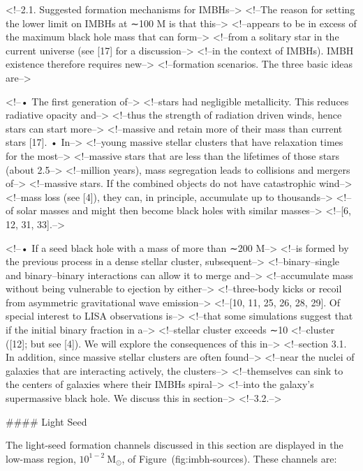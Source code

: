 {{{{{{{{{{{<!--2.1. Suggested formation mechanisms for IMBHs-->
<!--The reason for setting the lower limit on IMBHs at ∼100 M is that this-->
<!--appears to be in excess of the maximum black hole mass that can form-->
<!--from a solitary star in the current universe (see [17] for a discussion-->
<!--in the context of IMBHs). IMBH existence therefore requires new-->
<!--formation scenarios. The three basic ideas are-->

<!--• The first generation of-->
<!--stars had negligible metallicity. This reduces radiative opacity and-->
<!--thus the strength of radiation driven winds, hence stars can start more-->
<!--massive and retain more of their mass than current stars [17]. • In-->
<!--young massive stellar clusters that have relaxation times for the most-->
<!--massive stars that are less than the lifetimes of those stars (about 2.5-->
<!--million years), mass segregation leads to collisions and mergers of-->
<!--massive stars. If the combined objects do not have catastrophic wind-->
<!--mass loss (see [4]), they can, in principle, accumulate up to thousands-->
<!--of solar masses and might then become black holes with similar masses-->
<!--[6, 12, 31, 33].-->

<!--• If a seed black hole with a mass of more than ∼200 M-->
<!--is formed by the previous process in a dense stellar cluster, subsequent-->
<!--binary–single and binary–binary interactions can allow it to merge and-->
<!--accumulate mass without being vulnerable to ejection by either-->
<!--three-body kicks or recoil from asymmetric gravitational wave emission-->
<!--[10, 11, 25, 26, 28, 29]. Of special interest to LISA observations is-->
<!--that some simulations suggest that if the initial binary fraction in a-->
<!--stellar cluster exceeds ∼10%
<!--cluster ([12]; but see [4]). We will explore the consequences of this in-->
<!--section 3.1. In addition, since massive stellar clusters are often found-->
<!--near the nuclei of galaxies that are interacting actively, the clusters-->
<!--themselves can sink to the centers of galaxies where their IMBHs spiral-->
<!--into the galaxy’s supermassive black hole. We discuss this in section-->
<!--3.2.-->



#### Light Seed

The light-seed formation channels discussed in this section are
displayed in the low-mass region, $10^{1-2} \ \text{M}_{\odot}$, of
Figure~\@ref(fig:imbh-sources). These channels are:


}}}}}}}}}}}
